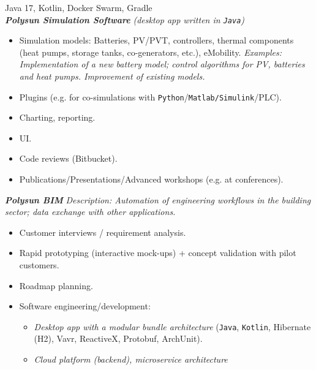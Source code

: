 \documentclass[11pt,a4paper,ngerman,sans]{moderncv}
\begin{document}
{
  Java 17, Kotlin, Docker Swarm, Gradle\newline
  \\
	\textbf{\emph{Polysun Simulation Software}} \emph{(desktop app written in \texttt{Java})}
  \begin{itemize}
    \item Simulation models: Batteries, PV/PVT, controllers, thermal components\newline
      (heat pumps, storage tanks, co-generators, etc.), eMobility.\newline
      \emph{
       Examples: Implementation of a new battery model;\newline
       control algorithms for PV, batteries and heat pumps.\newline
       Improvement of existing models.
      }
    \item Plugins (e.g. for co-simulations with \texttt{Python}/\texttt{Matlab/Simulink}/PLC).
    \item Charting, reporting.
    \item UI. 
    \item Code reviews (Bitbucket).
    \item Publications/Presentations/Advanced workshops (e.g. at conferences).
      \\
  \end{itemize}
	\textbf{\emph{Polysun BIM}} 
	\emph{Description: Automation of engineering workflows in the building sector;\newline
	data exchange with other applications.}\newline
  \begin{itemize}
    \item Customer interviews / requirement analysis.
    \item Rapid prototyping (interactive mock-ups) + concept validation with pilot customers.
    \item Roadmap planning.
    \item Software engineering/development:
      \begin{itemize}
        \item \emph{Desktop app with a modular bundle architecture}\newline
          (\texttt{Java}, \texttt{Kotlin}, Hibernate (H2), Vavr, ReactiveX, Protobuf, ArchUnit).
        \item \emph{Cloud platform (backend), microservice architecture}\newline

\end{itemize}
\end{itemize}}
\end{document}

